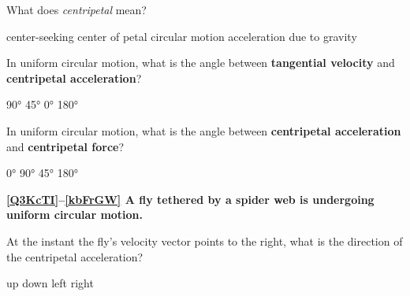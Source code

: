 \documentclass[dvipsnames]{exam}
\begin{document}
\begin{questions}
\question
What does \textit{centripetal} mean?

\begin{randomizechoices}
    \correctchoice center-seeking
    \choice center of petal
    \choice circular motion
    \choice acceleration due to gravity
\end{randomizechoices}

\question
In uniform circular motion, what is the angle between \textbf{tangential velocity} and \textbf{centripetal acceleration}?

\begin{randomizechoices}
    \correctchoice \ang{90}
    \choice \ang{45}
    \choice \ang{0}
    \choice \ang{180}
\end{randomizechoices}

\question
In uniform circular motion, what is the angle between \textbf{centripetal acceleration} and \textbf{centripetal force}?

\begin{randomizechoices}
    \correctchoice \ang{0}
    \choice \ang{90}
    \choice \ang{45}
    \choice \ang{180}
\end{randomizechoices}

\clearpage

\begin{EnvUplevel}
    \textbf{\ref{Q3KcTI}--\ref{kbFrGW} A fly tethered by a spider web is undergoing uniform circular motion.}
\end{EnvUplevel}

\question \label{Q3KcTI}
 At the instant the fly's velocity vector points to the right, what is the direction of the centripetal acceleration?

\begin{minipage}{6cm}
    \centering
    \begin{randomizechoices}
        \correctchoice up
        \choice down
        \choice left
        \choice right
    \end{randomizechoices}
\end{minipage}%
\begin{minipage}{6cm}
    \centering
\begin{center}
    \end{center}    
\end{minipage}



\end{questions}
\end{document}
